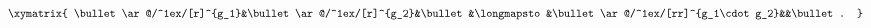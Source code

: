 \begin{equation}
\label{eq_compose}
\begin{aligned}
\xymatrix{
  \bullet\ar@/^1ex/[r]^{g_1}&\bullet\ar@/^1ex/[r]^{g_2}&\bullet&\longmapsto&\bullet\ar@/^1ex/[rr]^{g_1\cdot g_2}&&\bullet.
}
\end{aligned}
\end{equation}

